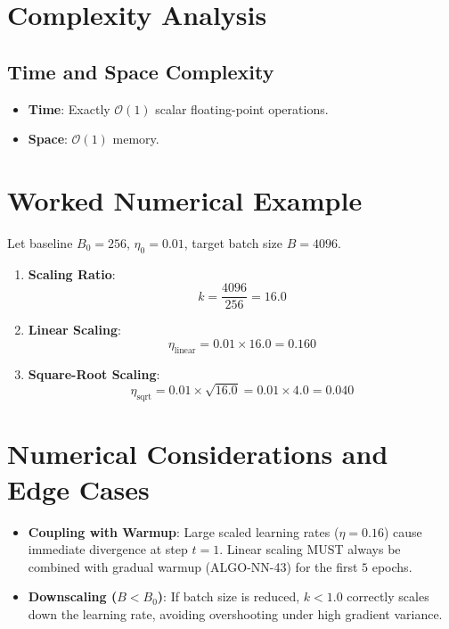 \documentclass[11pt,a4paper]{article}
\theoremstyle{definition}
\begin{document}
\section{Complexity Analysis}

\subsection{Time and Space Complexity}
\begin{itemize}
    \item \textbf{Time}: Exactly $\mathcal{O}(1)$ scalar floating-point operations.
    \item \textbf{Space}: $\mathcal{O}(1)$ memory.
\end{itemize}

\section{Worked Numerical Example}

Let baseline $B_0 = 256$, $\eta_0 = 0.01$, target batch size $B = 4096$.

\begin{enumerate}
    \item \textbf{Scaling Ratio}:
    \begin{equation}
    k = \frac{4096}{256} = 16.0
    \end{equation}
    \item \textbf{Linear Scaling}:
    \begin{equation}
    \eta_{\text{linear}} = 0.01 \times 16.0 = 0.160
    \end{equation}
    \item \textbf{Square-Root Scaling}:
    \begin{equation}
    \eta_{\text{sqrt}} = 0.01 \times \sqrt{16.0} = 0.01 \times 4.0 = 0.040
    \end{equation}
\end{enumerate}

\section{Numerical Considerations and Edge Cases}

\begin{itemize}
    \item \textbf{Coupling with Warmup}: Large scaled learning rates ($\eta = 0.16$) cause immediate divergence at step $t=1$. Linear scaling MUST always be combined with gradual warmup (ALGO-NN-43) for the first $5$ epochs.
    \item \textbf{Downscaling ($B < B_0$)}: If batch size is reduced, $k < 1.0$ correctly scales down the learning rate, avoiding overshooting under high gradient variance.
\end{itemize}
\end{document}
